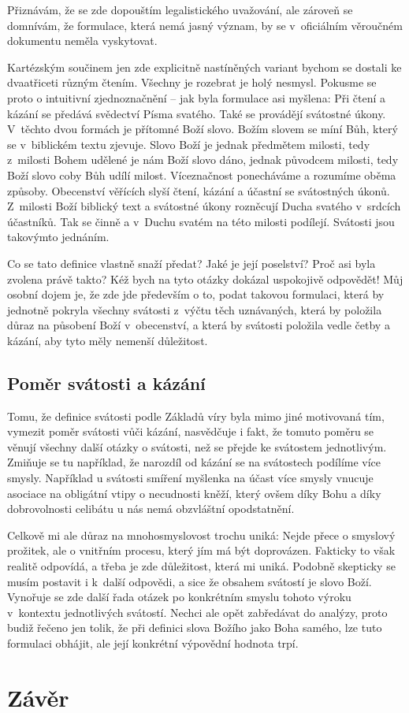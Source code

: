 Přiznávám, že se zde dopouštím legalistického uvažování, ale zároveň se
domnívám, že formulace, která nemá jasný význam, by se  v~oficiálním
věroučném dokumentu neměla vyskytovat.

Kartézským součinem jen zde explicitně nastíněných variant bychom se dostali ke
dvaatřiceti různým čtením. Všechny je rozebrat je holý nesmysl. Pokusme se proto o
intuitivní zjednoznačnění -- jak byla formulace asi myšlena: Při čtení a kázání
se předává svědectví Písma svatého. Také se provádějí svátostné úkony. V~těchto
dvou formách je přítomné Boží slovo. Božím slovem se míní Bůh, který se
v~biblickém textu zjevuje. Slovo Boží je jednak předmětem milosti, tedy
z~milosti Bohem udělené je nám Boží slovo dáno, jednak původcem milosti, tedy
Boží slovo coby Bůh udílí milost. Víceznačnost ponecháváme a rozumíme oběma
způsoby. Obecenství věřících slyší čtení, kázání a účastní se svátostných úkonů.
Z~milosti Boží biblický text a svátostné úkony rozněcují Ducha svatého v~srdcích
účastníků. Tak se činně a v~Duchu svatém  na této  milosti podílejí. Svátosti
jsou takovýmto jednáním.

Co se tato definice vlastně snaží předat? Jaké je její poselství? Proč asi byla
zvolena právě takto? Kéž bych na tyto otázky dokázal uspokojivě odpovědět! Můj
osobní dojem je, že zde jde především o to, podat takovou formulaci, která by
jednotně pokryla všechny svátosti z~výčtu těch uznávaných, která by položila
důraz na působení Boží v~obecenství, a která by svátosti položila vedle četby a
kázání, aby tyto měly nemenší důležitost.

\section{Poměr svátosti a kázání}

Tomu, že definice svátosti podle Základů víry byla mimo jiné motivovaná tím,
vymezit poměr svátosti vůči kázání, nasvědčuje i fakt, že tomuto poměru se
věnují všechny další otázky o svátosti, než se přejde ke svátostem jednotlivým.
Zmiňuje se tu například, že narozdíl od kázání se na svátostech podílíme více
smysly. Například u svátosti smíření myšlenka na účast více smysly vnucuje
asociace na obligátní vtipy o necudnosti kněží, který ovšem díky Bohu a díky
dobrovolnosti celibátu u nás nemá obzvláštní opodstatnění.

Celkově mi ale důraz na mnohosmyslovost trochu uniká: Nejde přece o smyslový
prožitek, ale o vnitřním procesu, který jím má být doprovázen. Fakticky to však
realitě odpovídá, a třeba je zde důležitost, která mi uniká. Podobně skepticky
se musím postavit i k~další odpovědi, a sice že obsahem svátostí je slovo Boží.
Vynořuje se zde další řada otázek po konkrétním smyslu tohoto výroku v~kontextu
jednotlivých svátostí. Nechci ale opět zabředávat do analýzy, proto budiž řečeno
jen tolik, že při definici slova Božího jako Boha samého, lze tuto formulaci
obhájit, ale její konkrétní výpovědní hodnota trpí.

\vspace{15mm}
\chapter{Závěr}
\label{div:zaver}

